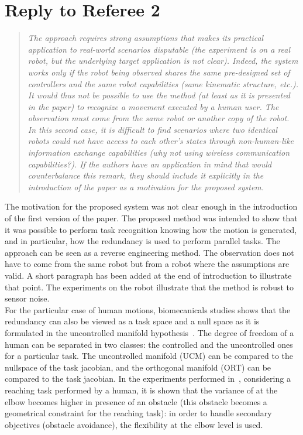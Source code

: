 \documentclass[11pt]{article}
\begin{document}
\section{Reply to Referee 2}

\begin{quote}
\textit{
The approach requires strong assumptions that makes its practical application to real-world scenarios disputable (the experiment is on a real robot, but the underlying target application is not clear). Indeed, the system works only if the robot being observed shares the same pre-designed set of controllers and the same robot capabilities (same kinematic structure, etc.). It would thus not be possible to use the method (at least as it is presented in the paper) to recognize a movement executed by a human user. The observation must come from the same robot or another copy of the robot. In this second case, it is difficult to find scenarios where two identical robots could not have access to each other's states through non-human-like information exchange capabilities (why not using wireless communication capabilities?). If the authors have an application in mind that would counterbalance this remark, they should include it explicitly in the introduction of the paper as a motivation for the proposed system.
}
\end{quote}
The motivation for the proposed system was not clear enough in the introduction of the first version of the paper.
The proposed method was intended to show that it was possible to perform task recognition 
knowing how the motion is generated, and in particular, how the redundancy
is used to perform parallel tasks. The approach can be seen as a reverse engineering method.
The observation does not have to come from the same robot but from a robot where the 
assumptions are valid. A short paragraph has been added at the end of introduction to
illustrate that point. The experiments on the robot illustrate that the method 
is robust to sensor noise.\\

For the particular case of human motions, biomecanicals studies
shows that the redundancy can also be viewed as a task space and a null space as it 
is formulated in the uncontrolled manifold hypothesis~\cite{scholz99}.
The degree of freedom of a human can be separated in two classes:
the controlled and the uncontrolled ones for a particular task.
The uncontrolled manifold (UCM) can be compared to the nullspace of the task jacobian,
and the orthogonal manifold (ORT) can be compared to the task jacobian.
In the experiments performed in~\cite{jacquierbret09},
considering a reaching task performed by a human, it is shown that the variance
of at the elbow becomes higher in presence of an obstacle (this obstacle becomes 
a geometrical constraint for the reaching task): in order to handle 
secondary objectives (obstacle avoidance), the flexibility at the elbow level is used.\\
\end{document}
